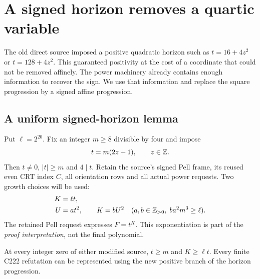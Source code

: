 \section{A signed horizon removes a quartic variable}
\label{sec:quartic}

The old direct source imposed a positive quadratic horizon such as
$t=16+4z^2$ or $t=128+4z^2$. This guaranteed positivity at the cost of
a coordinate that could not be removed affinely. The power machinery
already contains enough information to recover the sign. We use
that information and replace the square progression by a signed
affine progression.

\subsection{A uniform signed-horizon lemma}

Put $\ell=2^{20}$. Fix an integer $m\ge8$ divisible by four and impose
\[
 t=m(2z+1),\qquad z\in\mathbb Z.
\]
Then $t\ne0$, $|t|\ge m$ and $4\mid t$. Retain the source's signed
Pell frame, its reused even CRT index $C$, all orientation rows and
all actual power requests. Two growth choices will be used:
\begin{align}
 K&=\ell t, \label{eq:linear-growth}\\
 U&=a t^2,\qquad K=bU^2
 \quad(a,b\in\mathbb Z_{>0},\;ba^2m^3\ge\ell).
 \label{eq:quartic-growth}
\end{align}
The retained Pell request expresses $F=t^K$. This exponentiation
is part of the \emph{proof interpretation}, not the final polynomial.

\begin{lemma}\label{lem:signed-horizon}
At every integer zero of either modified source, $t\ge m$ and
$K\ge\ell t$. Every finite C222 refutation can be represented using
the new positive branch of the horizon progression.
\end{lemma}

